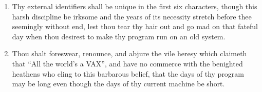\begin{enumerate}
\item Thy external identifiers shall be unique in the first six characters,
though this harsh discipline be irksome and the years of its necessity stretch
before thee seemingly without end, lest thou tear thy hair out and go mad on
that fateful day when thou desirest to make thy program run on an old system. 

\item Thou shalt foreswear, renounce, and abjure the vile heresy which claimeth
that ``All the  world's a VAX'', and have no commerce with the benighted
heathens who cling to this  barbarous belief, that the days of thy program may
be long even though the days of thy current machine be short. 
\end{enumerate}
